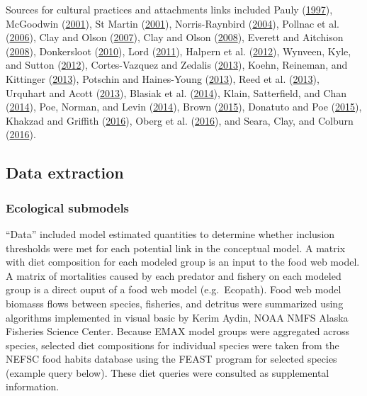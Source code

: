 \documentclass[
]{book}
\begin{document}
Sources for cultural practices and attachments links included Pauly (\protect\hyperlink{ref-pauly_putting_1997}{1997}), McGoodwin (\protect\hyperlink{ref-mcgoodwin_understanding_2001}{2001}), St Martin (\protect\hyperlink{ref-st_martin_making_2001}{2001}), Norris-Raynbird (\protect\hyperlink{ref-norris-raynbird_for_2004}{2004}), Pollnac et al. (\protect\hyperlink{ref-pollnac_toward_2006}{2006}), Clay and Olson (\protect\hyperlink{ref-clay_defining_2007}{2007}), Clay and Olson (\protect\hyperlink{ref-clay_definingfishing_2008}{2008}), Everett and Aitchison (\protect\hyperlink{ref-everett_role_2008}{2008}), Donkersloot (\protect\hyperlink{ref-donkersloot_politics_2010}{2010}), Lord (\protect\hyperlink{ref-lord_understanding_2011}{2011}), Halpern et al. (\protect\hyperlink{ref-halpern_index_2012}{2012}), Wynveen, Kyle, and Sutton (\protect\hyperlink{ref-wynveen_natural_2012}{2012}), Cortes-Vazquez and Zedalis (\protect\hyperlink{ref-cortes-vazquez_identity_2013}{2013}), Koehn, Reineman, and Kittinger (\protect\hyperlink{ref-koehn_progress_2013}{2013}), Potschin and Haines-Young (\protect\hyperlink{ref-potschin_landscapes_2013}{2013}), Reed et al. (\protect\hyperlink{ref-reed_beyond_2013}{2013}), Urquhart and Acott (\protect\hyperlink{ref-urquhart_constructing_2013}{2013}), Blasiak et al. (\protect\hyperlink{ref-blasiak_paradigms_2014}{2014}), Klain, Satterfield, and Chan (\protect\hyperlink{ref-klain_what_2014}{2014}), Poe, Norman, and Levin (\protect\hyperlink{ref-poe_cultural_2014}{2014}), Brown (\protect\hyperlink{ref-brown_we_2015}{2015}), Donatuto and Poe (\protect\hyperlink{ref-donatuto_evaluating_2015}{2015}), Khakzad and Griffith (\protect\hyperlink{ref-khakzad_role_2016}{2016}), Oberg et al. (\protect\hyperlink{ref-oberg_surviving_2016}{2016}), and Seara, Clay, and Colburn (\protect\hyperlink{ref-seara_perceived_2016}{2016}).

\hypertarget{data-extraction-11}{%
\subsection{Data extraction}\label{data-extraction-11}}

\hypertarget{ecological-submodels-1}{%
\subsubsection{Ecological submodels}\label{ecological-submodels-1}}

``Data'' included model estimated quantities to determine whether inclusion thresholds were met for each potential link in the conceptual model. A matrix with diet composition for each modeled group is an input to the food web model. A matrix of mortalities caused by each predator and fishery on each modeled group is a direct ouput of a food web model (e.g.~Ecopath). Food web model biomasss flows between species, fisheries, and detritus were summarized using algorithms implemented in visual basic by Kerim Aydin, NOAA NMFS Alaska Fisheries Science Center. Because EMAX model groups were aggregated across species, selected diet compositions for individual species were taken from the NEFSC food habits database using the FEAST program for selected species (example query below). These diet queries were consulted as supplemental information.
\end{document}
